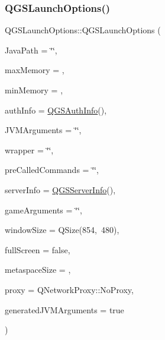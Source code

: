 \subsubsection{\texorpdfstring{Q\+G\+S\+Launch\+Options()}{QGSLaunchOptions()}\hspace{0.1cm}{\footnotesize\ttfamily [1/3]}}
{\footnotesize\ttfamily Q\+G\+S\+Launch\+Options\+::\+Q\+G\+S\+Launch\+Options (\begin{DoxyParamCaption}\item[{Q\+String}]{Java\+Path = {\ttfamily \char`\"{}\char`\"{}},  }\item[{int}]{max\+Memory = {},  }\item[{int}]{min\+Memory = {},  }\item[{\mbox{\hyperlink{class_q_g_s_auth_info}{Q\+G\+S\+Auth\+Info}}}]{auth\+Info = {\ttfamily \mbox{\hyperlink{class_q_g_s_auth_info}{Q\+G\+S\+Auth\+Info}}()},  }\item[{Q\+String}]{J\+V\+M\+Arguments = {\ttfamily \char`\"{}\char`\"{}},  }\item[{Q\+String}]{wrapper = {\ttfamily \char`\"{}\char`\"{}},  }\item[{Q\+String}]{pre\+Called\+Commands = {\ttfamily \char`\"{}\char`\"{}},  }\item[{\mbox{\hyperlink{class_q_g_s_server_info}{Q\+G\+S\+Server\+Info}}}]{server\+Info = {\ttfamily \mbox{\hyperlink{class_q_g_s_server_info}{Q\+G\+S\+Server\+Info}}()},  }\item[{Q\+String}]{game\+Arguments = {\ttfamily \char`\"{}\char`\"{}},  }\item[{Q\+Size}]{window\+Size = {\ttfamily QSize(854,~480)},  }\item[{bool}]{full\+Screen = {\ttfamily false},  }\item[{int}]{metaspace\+Size = {},  }\item[{Q\+Network\+Proxy}]{proxy = {\ttfamily QNetworkProxy\+:\+:NoProxy},  }\item[{bool}]{generated\+J\+V\+M\+Arguments = {\ttfamily true} }\end{DoxyParamCaption})}

\mbox{\label{class_q_g_s_launch_options_ae576c820f78cfead80455fc1a8921514}} 
